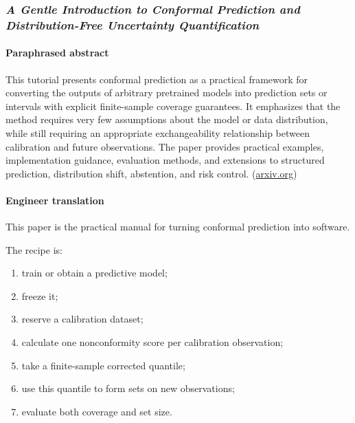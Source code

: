 \subsubsection{\texorpdfstring{\emph{A Gentle Introduction to Conformal Prediction and Distribution-Free Uncertainty Quantification}}{A Gentle Introduction to Conformal Prediction and Distribution-Free Uncertainty Quantification}}\label{a-gentle-introduction-to-conformal-prediction-and-distribution-free-uncertainty-quantification}

\paragraph{Paraphrased abstract}\label{paraphrased-abstract-1}

This tutorial presents conformal prediction as a practical framework for converting the outputs of arbitrary pretrained models into prediction sets or intervals with explicit finite-sample coverage guarantees. It emphasizes that the method requires very few assumptions about the model or data distribution, while still requiring an appropriate exchangeability relationship between calibration and future observations. The paper provides practical examples, implementation guidance, evaluation methods, and extensions to structured prediction, distribution shift, abstention, and risk control. (\href{https://arxiv.org/abs/2107.07511?utm_source=chatgpt.com}{arxiv.org})

\paragraph{Engineer translation}\label{engineer-translation-1}

This paper is the practical manual for turning conformal prediction into software.

The recipe is:

\begin{enumerate}
\def\labelenumi{\arabic{enumi}.}
\tightlist
\item
  train or obtain a predictive model;
\item
  freeze it;
\item
  reserve a calibration dataset;
\item
  calculate one nonconformity score per calibration observation;
\item
  take a finite-sample corrected quantile;
\item
  use this quantile to form sets on new observations;
\item
  evaluate both coverage and set size.
\end{enumerate}

